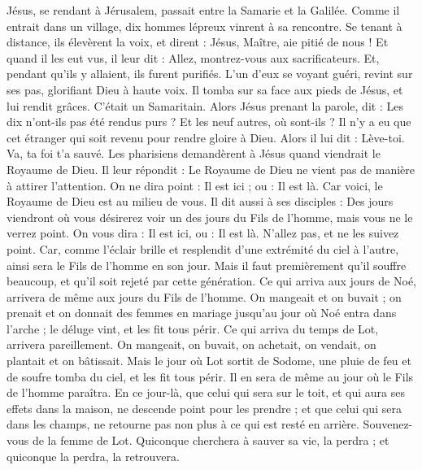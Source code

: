 \begin{multicols}{2}
Jésus, se rendant à Jérusalem, passait entre la Samarie et la Galilée.
Comme il entrait dans un village, dix hommes lépreux vinrent à sa rencontre. Se tenant à distance, ils élevèrent la voix, et dirent :
Jésus, Maître, aie pitié de nous !
Et quand il les eut vus, il leur dit : Allez, montrez-vous aux sacrificateurs. Et, pendant qu’ils y allaient, ils furent purifiés.
L’un d'eux se voyant guéri, revint sur ses pas, glorifiant Dieu à haute voix.
Il tomba sur sa face aux pieds de Jésus, et lui rendit grâces. C’était un Samaritain.
Alors Jésus prenant la parole, dit : Les dix n'ont-ils pas été rendus purs ? Et les neuf autres, où sont-ils ?
Il n'y a eu que cet étranger qui soit revenu pour rendre gloire à Dieu.
Alors il lui dit : Lève-toi. Va, ta foi t'a sauvé.
Les pharisiens demandèrent à Jésus quand viendrait le Royaume de Dieu. Il leur répondit : Le Royaume de Dieu ne vient pas de manière à attirer l’attention.
On ne dira point : Il est ici ; ou : Il est là. Car voici, le Royaume de Dieu est au milieu de vous.
Il dit aussi à ses disciples : Des jours viendront où vous désirerez voir un des jours du Fils de l'homme, mais vous ne le verrez point. On vous dira :
Il est ici, ou : Il est là. N’allez pas, et ne les suivez point.
Car, comme l'éclair brille et resplendit d’une extrémité du ciel à l’autre, ainsi sera le Fils de l’homme en son jour.
Mais il faut premièrement qu'il souffre beaucoup, et qu'il soit rejeté par cette génération.
Ce qui arriva aux jours de Noé, arrivera de même aux jours du Fils de l'homme.
On mangeait et on buvait ; on prenait et on donnait des femmes en mariage jusqu'au jour où Noé entra dans l'arche ; le déluge vint, et les fit tous périr.
Ce qui arriva du temps de Lot, arrivera pareillement. On mangeait, on buvait, on achetait, on vendait, on plantait et on bâtissait.
Mais le jour où Lot sortit de Sodome, une pluie de feu et de soufre tomba du ciel, et les fit tous périr.
Il en sera de même au jour où le Fils de l'homme paraîtra.
En ce jour-là, que celui qui sera sur le toit, et qui aura ses effets dans la maison, ne descende point pour les prendre ; et que celui qui sera dans les champs, ne retourne pas non plus à ce qui est resté en arrière.
Souvenez-vous de la femme de Lot.
Quiconque cherchera à sauver sa vie, la perdra ; et quiconque la perdra, la retrouvera.

\end{multicols}
